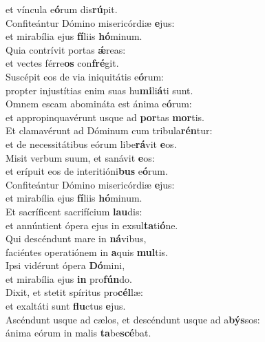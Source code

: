 \evenverse et víncula e\textbf{ó}rum dis\textbf{rú}pit.\\
\oddverse Confiteántur Dómino misericórdiæ \textbf{e}jus:~\*\\
\oddverse et mirabília ejus \textbf{fí}liis \textbf{hó}minum.\\
\evenverse Quia contrívit portas \textbf{ǽ}reas:~\*\\
\evenverse et vectes férre\textbf{os} con\textbf{fré}git.\\
\oddverse Suscépit eos de via iniquitátis e\textbf{ó}rum:~\*\\
\oddverse propter injustítias enim suas hu\textbf{mi}li\textbf{á}ti sunt.\\
\evenverse Omnem escam abomináta est ánima e\textbf{ó}rum:~\*\\
\evenverse et appropinquavérunt usque ad \textbf{por}tas \textbf{mor}tis.\\
\oddverse Et clamavérunt ad Dóminum cum tribula\textbf{rén}tur:~\*\\
\oddverse et de necessitátibus eórum libe\textbf{rá}vit \textbf{e}os.\\
\evenverse Misit verbum suum, et sanávit \textbf{e}os:~\*\\
\evenverse et erípuit eos de interitióni\textbf{bus} e\textbf{ó}rum.\\
\oddverse Confiteántur Dómino misericórdiæ \textbf{e}jus:~\*\\
\oddverse et mirabília ejus \textbf{fí}liis \textbf{hó}minum.\\
\evenverse Et sacríficent sacrifícium \textbf{lau}dis:~\*\\
\evenverse et annúntient ópera ejus in exsul\textbf{ta}ti\textbf{ó}ne.\\
\oddverse Qui descéndunt mare in \textbf{ná}vibus,~\*\\
\oddverse faciéntes operatiónem in \textbf{a}quis \textbf{mul}tis.\\
\evenverse Ipsi vidérunt ópera \textbf{Dó}mini,~\*\\
\evenverse et mirabília ejus \textbf{in} pro\textbf{fún}do.\\
\oddverse Dixit, et stetit spíritus pro\textbf{cél}læ:~\*\\
\oddverse et exaltáti sunt \textbf{flu}ctus \textbf{e}jus.\\
\evenverse Ascéndunt usque ad cælos, et descéndunt usque ad a\textbf{býs}sos:~\*\\
\evenverse ánima eórum in malis \textbf{ta}be\textbf{scé}bat.\\
